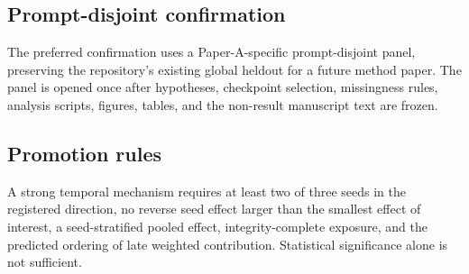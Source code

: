 \subsection{Prompt-disjoint confirmation}

The preferred confirmation uses a Paper-A-specific prompt-disjoint panel, preserving the repository's existing global heldout for a future method paper. The panel is opened once after hypotheses, checkpoint selection, missingness rules, analysis scripts, figures, tables, and the non-result manuscript text are frozen.

\subsection{Promotion rules}

A strong temporal mechanism requires at least two of three seeds in the registered direction, no reverse seed effect larger than the smallest effect of interest, a seed-stratified pooled effect, integrity-complete exposure, and the predicted ordering of late weighted contribution. Statistical significance alone is not sufficient.
